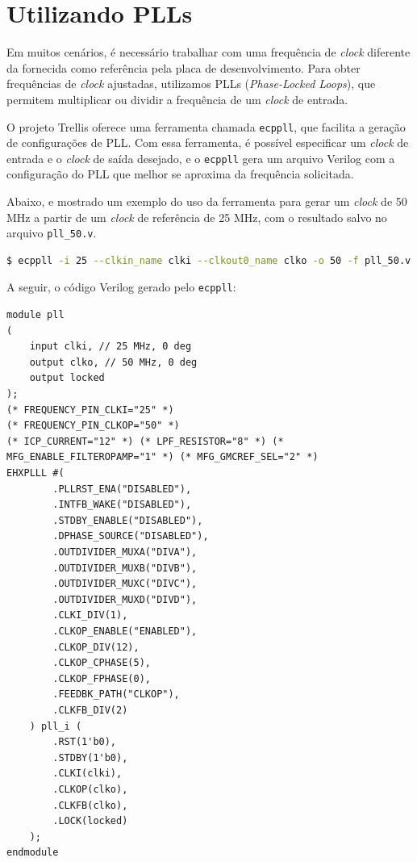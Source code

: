 \documentclass{report}
\begin{document}
\section{Utilizando PLLs}

Em muitos cenários, é necessário trabalhar com uma frequência de \textit{clock} diferente da fornecida como referência pela placa de desenvolvimento. Para obter frequências de \textit{clock} ajustadas, utilizamos PLLs (\textit{Phase-Locked Loops}), que permitem multiplicar ou dividir a frequência de um \textit{clock} de entrada.

O projeto Trellis oferece uma ferramenta chamada \texttt{ecppll}, que facilita a geração de configurações de PLL. Com essa ferramenta, é possível especificar um \textit{clock} de entrada e o \textit{clock} de saída desejado, e o \texttt{ecppll} gera um arquivo Verilog com a configuração do PLL que melhor se aproxima da frequência solicitada. 

Abaixo, e mostrado um exemplo do uso da ferramenta para gerar um \textit{clock} de 50 MHz a partir de um \textit{clock} de referência de 25 MHz, com o resultado salvo no arquivo \texttt{pll\_50.v}.

\begin{lstlisting}[language=bash]
$ ecppll -i 25 --clkin_name clki --clkout0_name clko -o 50 -f pll_50.v
\end{lstlisting}

A seguir, o código Verilog gerado pelo \texttt{ecppll}:

\begin{lstlisting}[style=verilog-style, caption={Arquivo pll\_50.v}]
module pll
(
    input clki, // 25 MHz, 0 deg
    output clko, // 50 MHz, 0 deg
    output locked
);
(* FREQUENCY_PIN_CLKI="25" *)
(* FREQUENCY_PIN_CLKOP="50" *)
(* ICP_CURRENT="12" *) (* LPF_RESISTOR="8" *) (* MFG_ENABLE_FILTEROPAMP="1" *) (* MFG_GMCREF_SEL="2" *)
EHXPLLL #(
        .PLLRST_ENA("DISABLED"),
        .INTFB_WAKE("DISABLED"),
        .STDBY_ENABLE("DISABLED"),
        .DPHASE_SOURCE("DISABLED"),
        .OUTDIVIDER_MUXA("DIVA"),
        .OUTDIVIDER_MUXB("DIVB"),
        .OUTDIVIDER_MUXC("DIVC"),
        .OUTDIVIDER_MUXD("DIVD"),
        .CLKI_DIV(1),
        .CLKOP_ENABLE("ENABLED"),
        .CLKOP_DIV(12),
        .CLKOP_CPHASE(5),
        .CLKOP_FPHASE(0),
        .FEEDBK_PATH("CLKOP"),
        .CLKFB_DIV(2)
    ) pll_i (
        .RST(1'b0),
        .STDBY(1'b0),
        .CLKI(clki),
        .CLKOP(clko),
        .CLKFB(clko),
        .LOCK(locked)
    );
endmodule
\end{lstlisting}
\end{document}
